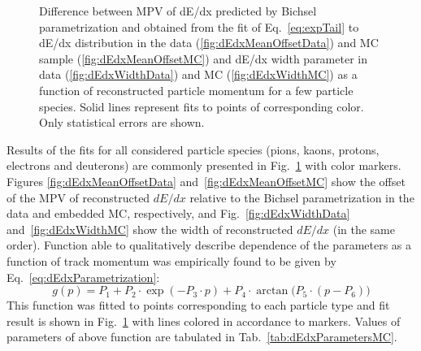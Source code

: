 \begin{figure}[hb!]
{}\vspace{-5pt}%
\caption[Parameters of reconstructed track dE/dx as a function of reconstructed momentum for a few particle species.]{Difference between MPV of dE/dx predicted by Bichsel parametrization and obtained from the fit of Eq.~\eqref{eq:expTail} to dE/dx distribution in the data (\ref{fig:dEdxMeanOffsetData}) and MC sample (\ref{fig:dEdxMeanOffsetMC}) and dE/dx width parameter in data (\ref{fig:dEdxWidthData}) and MC (\ref{fig:dEdxWidthMC}) as a function of reconstructed particle momentum for a few particle species. Solid lines represent fits to points of corresponding color. Only statistical errors are shown.}\label{fig:dEdxParametersMC}
\end{figure}


Results of the fits for all considered particle species (pions, kaons, protons, electrons and deuterons) are commonly presented in Fig.~\ref{fig:dEdxParametersMC} with color markers. Figures \ref{fig:dEdxMeanOffsetData} and~\ref{fig:dEdxMeanOffsetMC} show the offset of the MPV of reconstructed $dE/dx$ relative to the Bichsel parametrization in the data and embedded MC, respectively, and Fig.~\ref{fig:dEdxWidthData} and~\ref{fig:dEdxWidthMC} show the width of reconstructed $dE/dx$ (in the same order). Function able to qualitatively describe dependence of the parameters as a function of track momentum was empirically found to be given by Eq.~\eqref{eq:dEdxParametrization}:
%
\begin{equation}\label{eq:dEdxParametrization}
	g(p) = P_{1} + P_{2}\cdot \exp{\left(-P_{3}\cdot p\right)} + P_{4}\cdot \arctan{\big(P_{5}\cdot(p-P_{6})\big)}
\end{equation}
%
This function was fitted to points corresponding to each particle type and fit result is shown in Fig.~\ref{fig:dEdxParametersMC} with lines colored in accordance to markers. Values of parameters of above function are tabulated in Tab.~\ref{tab:dEdxParametersMC}.

